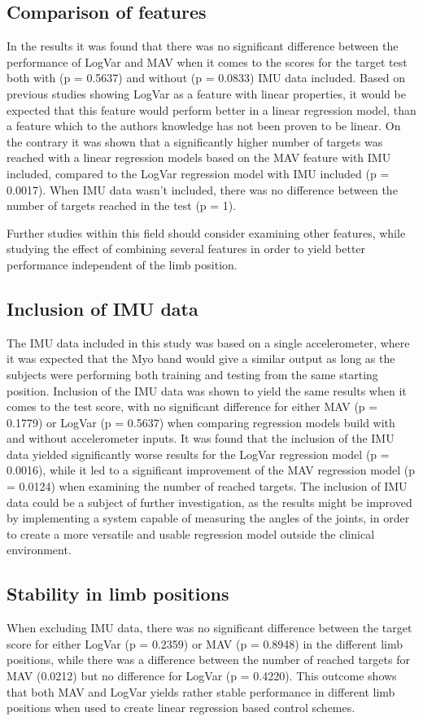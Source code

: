 	\subsection{Comparison of features}
	In the results it was found that there was no significant difference between the performance of LogVar and MAV when it comes to the scores for the target test both with (p = 0.5637) and without (p = 0.0833) IMU data included. Based on previous studies showing LogVar as a feature with linear properties, it would be expected that this feature would perform better in a linear regression model, than a feature which to the authors knowledge has not been proven to be linear. On the contrary it was shown that a significantly higher number of targets was reached with a linear regression models based on the MAV feature with IMU included, compared to the LogVar regression model with IMU included (p = 0.0017). When IMU data wasn't included, there was no difference between the number of targets reached in the test (p = 1).
	
	Further studies within this field should consider examining other features, while studying the effect of combining several features in order to yield better performance independent of the limb position.
	
	\subsection{Inclusion of IMU data}
	The IMU data included in this study was based on a single accelerometer, where it was expected that the Myo band would give a similar output as long as the subjects were performing both training and testing from the same starting position. Inclusion of the IMU data was shown to yield the same results when it comes to the test score, with no significant difference for either MAV (p = 0.1779) or LogVar (p = 0.5637) when comparing regression models build with and without accelerometer inputs. It was found that the inclusion of the IMU data yielded significantly worse results for the LogVar regression model (p = 0.0016), while it led to a significant improvement of the MAV regression model (p = 0.0124) when examining the number of reached targets. The inclusion of IMU data could be a subject of further investigation, as the results might be improved by implementing a system capable of measuring the angles of the joints, in order to create a more versatile and usable regression model outside the clinical environment.  
	
	\subsection{Stability in limb positions}
	When excluding IMU data, there was no significant difference between the target score for either LogVar (p = 0.2359) or MAV (p = 0.8948) in the different limb positions, while there was a difference between the number of reached targets for MAV (0.0212) but no difference for LogVar (p = 0.4220). This outcome shows that both MAV and LogVar yields rather stable performance in different limb positions when used to create linear regression based control schemes.
	
